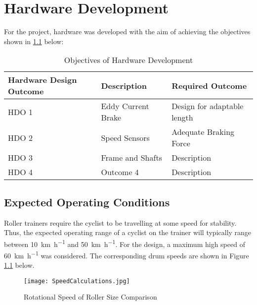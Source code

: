 
\chapter{Hardware Development}

For the project, hardware was developed with the aim of achieving the objectives shown in \ref{tab:devgoals} below:

\begin{table}[H]
	\color{red} %
	\renewcommand{\arraystretch}{1.2}
	\centering
	\caption{Objectives of Hardware Development}
	\begin{tabularx}{\textwidth}{p{2cm} >{\raggedright}p{5cm} >{\raggedright\arraybackslash}X}
		\toprule
		Hardware Design Outcome & Description          & Required Outcome            \\
		\midrule
		HDO 1            & Eddy Current Brake      & Design for adaptable length \\
		HDO 2            & Speed Sensors & Adequate Braking Force      \\
		HDO 3            & Frame and Shafts            & Description                 \\
		HDO 4            & Outcome 4            & Description                 \\
		\bottomrule
	\end{tabularx}
	\label{tab:devgoals}
\end{table}

\newpage

\section{Expected Operating Conditions}

Roller trainers require the cyclist to be travelling at some speed for stability. Thus, the expected operating range of a cyclist on the trainer will typically range between \SI{10}{\kilo\meter\per\hour} and \SI{50}{\kilo\meter\per\hour}. For the design, a maximum high speed of \SI{60}{\kilo\meter\per\hour} was considered. The corresponding drum speeds are shown in Figure \ref{fig:speedCalc} below.

\begin{figure}[H]
	\begin{center}
		\texttt{[image: SpeedCalculations.jpg]}
		\caption{Rotational Speed of Roller Size Comparison}
		\label{fig:speedCalc}
	\end{center}
\end{figure}

